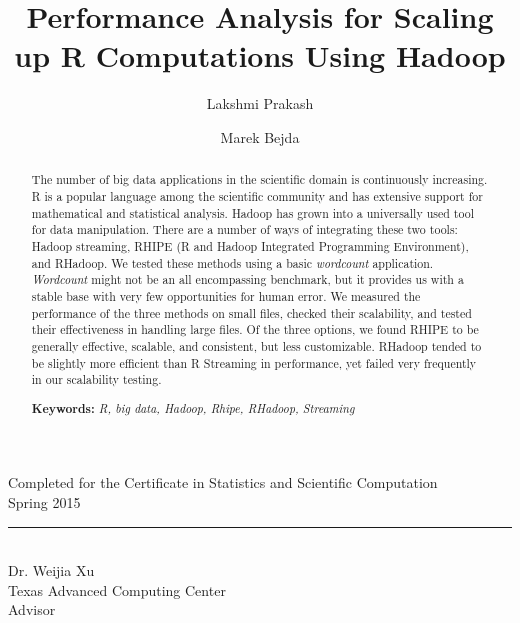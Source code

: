 \documentclass[
journal=jacsat, %
manuscript=article]{achemso}
\author{Lakshmi Prakash}
\author{Marek Bejda}
\affiliation[University of Texas at Austin]
{B.S. in Computer Science}
\title[\texttt{achemso} demonstration]
{Performance Analysis for Scaling up R Computations Using Hadoop}
\begin{document}
\vspace{35mm}
\begin{center}
\large
Completed for the Certificate in Statistics and Scientific Computation\\
Spring 2015
\end{center}
\vspace{35mm}

\noindent\rule{7cm}{0.4pt}\\
Dr. Weijia Xu\\
Texas Advanced Computing Center\\
Advisor
\newpage


\lstset{
basicstyle=\small\sffamily,
numbers=left,
numberstyle=\tiny,
frame=tb,
columns=fullflexible,
showstringspaces=false
}



\renewcommand{\abstractname}{Executive Summary}
\begin{abstract}
The number of big data applications in the scientific domain is continuously increasing. R is a popular language among the scientific community and has extensive support for mathematical and statistical analysis. Hadoop has grown into a universally used tool for data manipulation. There are a number of ways of integrating these two tools: Hadoop streaming, RHIPE (R and Hadoop Integrated Programming Environment), and RHadoop. We tested these methods using a basic \textit{wordcount} application. \textit{Wordcount} might not be an all encompassing benchmark, but it provides us with a stable base with very few opportunities for human error. We measured the performance of the three methods on small files, checked their scalability, and tested their effectiveness in handling large files. Of the three options, we found RHIPE to be generally effective, scalable, and consistent, but less customizable. RHadoop tended to be slightly more efficient than R Streaming in performance, yet failed very frequently in our scalability testing. 

\smallskip
\noindent \textbf{Keywords:} \textit{R, big data, Hadoop, Rhipe, RHadoop, Streaming}
\end{abstract}

\newpage
\singlespacing
\tableofcontents
\clearpage
\end{document}

